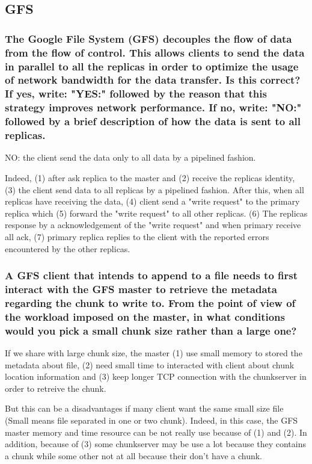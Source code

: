 \subsection{GFS}

\subsubsection*{The Google File System (GFS) decouples the flow of data
from the flow of control. This allows clients to send the data in
parallel to all the replicas in order to optimize the usage of network
bandwidth for the data transfer. Is this correct? If yes, write: "YES:"
followed by the reason that this strategy improves network performance.
If no, write: "NO:" followed by a brief description of how the data is
sent to all replicas.}

NO: the client send the data only to all data by a pipelined fashion.

Indeed, (1) after ask replica to the master and (2) receive the replicas
identity, (3) the client send data to all replicas by a pipelined
fashion. After this, when all replicas have receiving the data, (4)
client send a "write request" to the primary replica which (5) forward
the "write request" to all other replicas. (6) The replicas response by
a acknowledgement of the "write request" and when primary receive all
ack, (7) primary replica replies to the client with the reported errors
encountered by the other replicas.


\subsubsection*{A GFS client that intends to append to a file needs to
first interact with the GFS master to retrieve the metadata regarding
the chunk to write to. From the point of view of the workload imposed on
the master, in what conditions would you pick a small chunk size rather
than a large one?}

If we share with large chunk size, the master (1) use small memory to
stored the metadata about file, (2) need small time to interacted with
client about chunk location information and (3) keep longer TCP
connection with the chunkserver in order to retreive the chunk.

But this can be a disadvantages if many client want the same small size
file (Small means file separated in one or two chunk). Indeed, in this
case, the GFS master memory and time resource can be not really use
because of (1) and (2). In addition, because of (3) some chunkserver may
be use a lot because they contains a chunk while some other not at all
because their don't have a chunk. 

